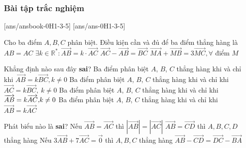 \subsubsection{Bài tập trắc nghiệm}
[ans/ansbook-0H1-3-5]
[ans/ans-0H1-3-5]
\begin{ex}%
	Cho ba điểm $ A,B,C$ phân biệt. Điều kiện cần và đủ để ba điểm thẳng hàng là
	\choice
	{$ AB=AC$}
	{\True $\exists k \in \mathbb{R}^*\colon \overrightarrow{AB}=k\cdot\overrightarrow{AC} $}
	{$\overrightarrow{AC}-\overrightarrow{AB}=\overrightarrow{BC}$}
	{$\overrightarrow{MA}+\overrightarrow{MB}=3\overrightarrow{MC},\forall $ điểm $ M$}
\end{ex}

\begin{ex}%
	Khẳng định nào sau đây  \textbf{sai}?
	\choice
	{Ba điểm phân biệt $A$, $B$, $C$ thẳng hàng khi và chỉ khi $\overrightarrow{AB} =k\overrightarrow{BC}, k\ne 0$}
	{Ba điểm phân biệt $A$,  $B$, $C$ thẳng hàng khi và chỉ khi $\overrightarrow{AC} =k\overrightarrow{BC},~k\ne 0$}
	{Ba điểm phân biệt $A$,  $B$, $C$ thẳng hàng khi và chỉ khi $\overrightarrow{AB}{\rm}=k\overrightarrow{AC}{\rm{,}}k\ne 0$}
	{\True Ba điểm phân biệt $A$, $B$, $C$ thẳng hàng khi và chỉ khi $\overrightarrow{AB}=k\overrightarrow{AC}$}
\end{ex}

\begin{ex}%
	Phát biểu nào là \textbf{sai}?
	\choice
	{Nếu $\overrightarrow{AB}=\overrightarrow{AC}$ thì $\left|\overrightarrow{AB}\right|=\left|\overrightarrow{AC}\right|$}
	{\True $\overrightarrow{AB}=\overrightarrow{CD}$ thì $ A,B,C,D$ thẳng hàng}
	{Nếu $3\overrightarrow{AB}+7\overrightarrow{AC}=\overrightarrow 0 $ thì $ A,B,C$ thẳng hàng}
	{$\overrightarrow{AB}-\overrightarrow{CD}=\overrightarrow{DC}-\overrightarrow{BA}$}
\end{ex}


